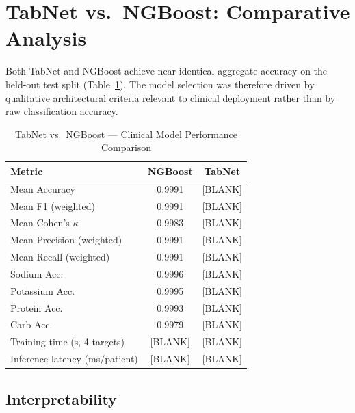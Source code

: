 \documentclass[journal]{IEEEtran}
\begin{document}
\section{TabNet vs.\ NGBoost: Comparative Analysis}
\label{sec:comparison}

Both TabNet and NGBoost achieve near-identical aggregate accuracy on
the held-out test split (Table~\ref{tab:comparison}). The model
selection was therefore driven by qualitative architectural criteria
relevant to clinical deployment rather than by raw classification
accuracy.

\begin{table}[!t]
\caption{TabNet vs.\ NGBoost --- Clinical Model Performance Comparison}
\label{tab:comparison}
\centering
\renewcommand{\arraystretch}{1.2}
\begin{tabular}{lcc}
\toprule
\textbf{Metric} & \textbf{NGBoost} & \textbf{TabNet} \\
\midrule
Mean Accuracy                   & 0.9991         & [BLANK] \\
Mean F1 (weighted)              & 0.9991         & [BLANK] \\
Mean Cohen's $\kappa$           & 0.9983         & [BLANK] \\
Mean Precision (weighted)       & 0.9991         & [BLANK] \\
Mean Recall (weighted)          & 0.9991         & [BLANK] \\
\midrule
Sodium Acc.                     & 0.9996         & [BLANK] \\
Potassium Acc.                  & 0.9995         & [BLANK] \\
Protein Acc.                    & 0.9993         & [BLANK] \\
Carb Acc.                       & 0.9979         & [BLANK] \\
\midrule
Training time (s, 4 targets)    & [BLANK]        & [BLANK] \\
Inference latency (ms/patient)  & [BLANK]        & [BLANK] \\
\bottomrule
\end{tabular}
\end{table}

\subsection{Interpretability}
\end{document}
